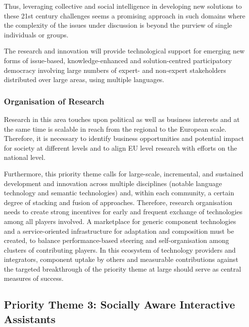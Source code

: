 \documentclass[10pt, plain]{../../metanetpaper}
\begin{document}
\begin{multicols}{2}
Thus, leveraging collective and social intelligence in developing new solutions to these 21st century challenges seems a promising approach in such domains where the complexity of the issues under discussion is beyond the purview of single individuals or groups.

The research and innovation will provide technological support for emerging new forms of issue-based, knowledge-enhanced and solution-centred participatory democracy involving large numbers of expert- and non-expert stakeholders distributed over large areas, using multiple languages.

\subsubsection{Organisation of Research}
\label{sec:organ-rese-pt2}

Research in this area touches upon political as well as business interests and at the same time is scalable in reach from the regional to the European scale. Therefore, it is necessary to identify business opportunities and potential impact for society at different levels and to align EU level research with efforts on the national level.


Furthermore, this priority theme calls for large-scale, incremental, and sustained development and innovation across multiple disciplines (notable language technology and semantic technologies) and, within each community, a certain degree of stacking and fusion of approaches. Therefore, research organisation needs to create strong incentives for early and frequent exchange of technologies among all players involved. A marketplace for generic component technologies and a service-oriented infrastructure for adaptation and composition must be created, to balance performance-based steering and self-organisation among clusters of contributing players. In this ecosystem of technology providers and integrators, component uptake by others and measurable contributions against the targeted breakthrough of the priority theme at large should serve as central measures of success.

\subsection{Priority Theme 3: Socially Aware Interactive Assistants}
\label{sec:priority-theme-3-interactive-assistant}



\end{multicols}
\end{document}
